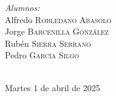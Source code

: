 \documentclass{article}
\begin{document}
\begin{titlepage}
\begin{minipage}{0.5\textwidth}
    \begin{flushleft} \large
        \emph{Alumnos:}\\
            Alfredo \textsc{Robledano Abasolo}\\ 
            Jorge \textsc{Barcenilla González}\\ 
            Rubén \textsc{Sierra Serrano}\\
            Pedro \textsc{García Silgo}
    \end{flushleft}
\end{minipage}\\[0.8cm]



{\large Martes 1 de abril de 2025}\\[2cm]
\vfill 

\end{titlepage}

\pagebreak



\pagebreak

\tableofcontents

\pagebreak



\pagebreak


\end{document}
